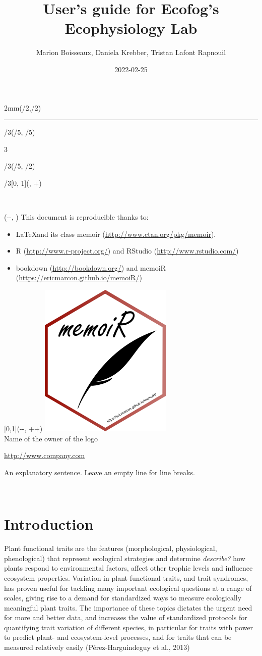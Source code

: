 \documentclass[
  12pt,
  american,
  a4paper,
  extrafontsizes,onecolumn,openright
  ]{memoir}
\title{User's guide for Ecofog's Ecophysiology Lab}
\author{Marion Boisseaux, Daniela Krebber, Tristan Lafont Rapnouil}
\date{2022-02-25}
\makeatletter
\newcommand{\MemoirChapStyle}{daleif1}
\newcommand{\MemoirPageStyle}{Ruled}
\newlength\widthw %
\newcommand*{\SmallMargins}{
  \setlrmarginsandblock{1.5in}{1.5in}{*}
  \setmarginnotes{0.1in}{0.1in}{0.1in}
 \setulmarginsandblock{1.5in}{1in}{*}
  \checkandfixthelayout
  \ch@ngetext
  \clearpage
  \setlength{\widthw}{\textwidth+\marginparsep+\marginparwidth}
  \footnotesatfoot
  \chapterstyle{\MemoirChapStyle}  %
  \pagestyle{\MemoirPageStyle}
}
\newcommand{\LargeMargins}{\SmallMargins}
\newcommand{\MainTitlePage}[2]{
  \SmallMargins %
  \pagestyle{empty} %
  \textblockorigin{\stockwidth-\paperwidth-\trimedge}{\trimtop} %
  \begin{textblock*}{2mm}(\spinemargin/2,\uppermargin/2)
    \rule{1pt}{\paperheight-\uppermargin}
  \end{textblock*}
  \begin{textblock*}{\paperwidth*2/3}(\paperwidth/5, \paperheight/5)
    \flushright
    \begin{Spacing}{3}
      {\fontfamily{qtm}\selectfont\fontsize{45}{45}\selectfont\textsc{\thetitle}}
    \end{Spacing}
  \end{textblock*}
    \begin{textblock*}{\paperwidth*2/3}(\paperwidth/5, \paperheight/2)
    \flushright
    {\fontfamily{qtm}\huge\theauthor}
  \end{textblock*}
    \begin{textblock*}{\paperwidth*2/3}[0, 1](\spinemargin, \uppermargin+\textheight)
    \normalfont\thedate
  \end{textblock*}
  ~\\ %
  \newpage
  \textblockorigin{\trimedge}{\trimtop} %
  \begin{textblock*}{\textwidth}(\paperwidth-\spinemargin-\textwidth, \uppermargin)
    #1
  \end{textblock*}
  \begin{textblock*}{\textwidth}[0,1](\paperwidth-\spinemargin-\textwidth, \uppermargin+\textheight+\footskip)
    \centering
    \includegraphics[width=\paperwidth/4]{logo}\\ \bigskip
    #2
  \end{textblock*}
  ~\\ %
  \newpage
}
\makeatother
\begin{document}
\frontmatter



\cleardoublepage

\MainTitlePage{This document is reproducible thanks to:

\begin{itemize}
  \item \LaTeX and its class memoir (\url{http://www.ctan.org/pkg/memoir}).
  \item R (\url{http://www.r-project.org/}) and RStudio (\url{http://www.rstudio.com/})
  \item bookdown (\url{http://bookdown.org/}) and memoiR (\url{https://ericmarcon.github.io/memoiR/})
\end{itemize}}{Name of the owner of the logo

\url{http://www.company.com}

An explanatory sentence.
Leave an empty line for line breaks.}







\LargeMargins
{
\hypersetup{linkcolor=}
\setcounter{tocdepth}{2}
\tableofcontents
}



\LargeMargins
\hypertarget{intro}{%
\chapter{Introduction}\label{intro}}

Plant functional traits are the features (morphological, physiological, phenological) that represent ecological strategies and determine \emph{describe?} how plants respond to environmental factors, affect other trophic levels and influence ecosystem properties.
Variation in plant functional traits, and trait syndromes, has proven useful for tackling many important ecological questions at a range of scales, giving rise to a demand for standardized ways to measure ecologically meaningful plant traits.
The importance of these topics dictates the urgent need for more and better data, and increases the value of standardized protocols for quantifying trait variation of different species, in particular for traits with power to predict plant- and ecosystem-level processes, and for traits that can be measured relatively easily (Pérez-Harguindeguy et al., 2013)
\end{document}
